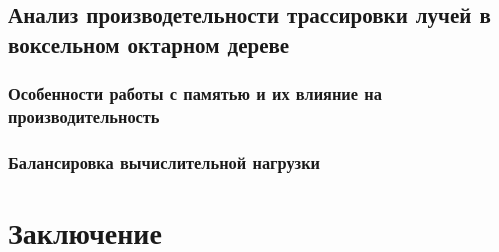 \documentclass[a4paper,14pt]{extreport}
\begin{document}
\section{Анализ производетельности трассировки лучей в воксельном октарном дереве}
\subsection{Особенности работы с памятью и их влияние на производительность}
\subsection{Балансировка вычислительной нагрузки}

\chapter*{Заключение}

\begin{thebibliography}{99}

\end{thebibliography}



%

%
%
%
%




\end{document}
